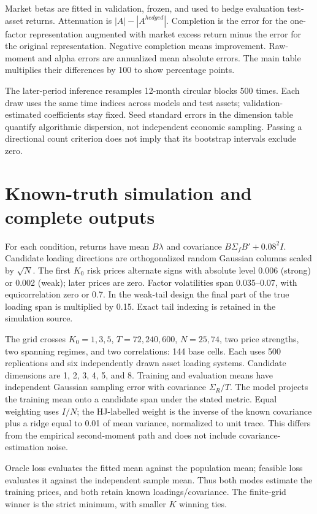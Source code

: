 \documentclass[11pt]{article}
\begin{document}
Market betas are fitted in validation, frozen, and used to hedge evaluation test-asset returns. Attenuation is $|A|-|A^{hedged}|$. Completion is the error for the one-factor representation augmented with market excess return minus the error for the original representation. Negative completion means improvement. Raw-moment and alpha errors are annualized mean absolute errors. The main table multiplies their differences by 100 to show percentage points.

The later-period inference resamples 12-month circular blocks 500 times. Each draw uses the same time indices across models and test assets; validation-estimated coefficients stay fixed. Seed standard errors in the dimension table quantify algorithmic dispersion, not independent economic sampling. Passing a directional count criterion does not imply that its bootstrap intervals exclude zero.



\section{Known-truth simulation and complete outputs}
\setcounter{equation}{0}
For each condition, returns have mean $B\lambda$ and covariance $B\Sigma_fB'+0.08^2I$. Candidate loading directions are orthogonalized random Gaussian columns scaled by $\sqrt N$. The first $K_0$ risk prices alternate signs with absolute level 0.006 (strong) or 0.002 (weak); later prices are zero. Factor volatilities span 0.035--0.07, with equicorrelation zero or 0.7. In the weak-tail design the final part of the true loading span is multiplied by 0.15. Exact tail indexing is retained in the simulation source.

The grid crosses $K_0=1,3,5$, $T=72,240,600$, $N=25,74$, two price strengths, two spanning regimes, and two correlations: 144 base cells. Each uses 500 replications and six independently drawn asset loading systems. Candidate dimensions are 1, 2, 3, 4, 5, and 8. Training and evaluation means have independent Gaussian sampling error with covariance $\Sigma_R/T$. The model projects the training mean onto a candidate span under the stated metric. Equal weighting uses $I/N$; the HJ-labelled weight is the inverse of the known covariance plus a ridge equal to 0.01 of mean variance, normalized to unit trace. This differs from the empirical second-moment path and does not include covariance-estimation noise.

Oracle loss evaluates the fitted mean against the population mean; feasible loss evaluates it against the independent sample mean. Thus both modes estimate the training prices, and both retain known loadings/covariance. The finite-grid winner is the strict minimum, with smaller $K$ winning ties.
\end{document}
